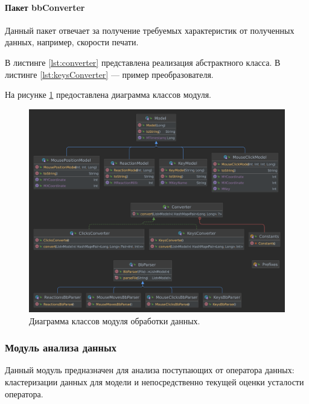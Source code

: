 

\paragraph{Пакет bbConverter \newline}
Данный пакет отвечает за получение требуемых характеристик от полученных данных, например, скорости печати.

В листинге \ref{lst:converter} представлена реализация абстрактного класса. В листинге \ref{lst:keysConverter} --- пример преобразователя.





На рисунке \ref{fig:processingUml} предоставлена диаграмма классов модуля.
\begin{figure}[H]
	\centering
	\includegraphics[width=\textwidth]{img/processing.pdf}
	\caption{Диаграмма классов модуля обработки данных.}
	\label{fig:processingUml}
\end{figure}

\subsubsection{Модуль анализа данных}
Данный модуль предназначен для анализа поступающих от оператора данных: кластеризации данных для модели и непосредственно текущей оценки усталости оператора.

